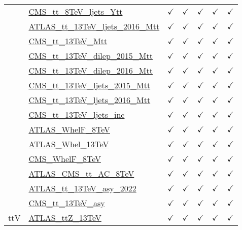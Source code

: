 \documentclass{article}
\begin{document}
\begin{longtable}{|c|l|c|c|c|c|c|}
 & \href{https://arxiv.org}{CMS_tt_8TeV_ljets_Ytt}  & $\checkmark$ & $\checkmark$ & $\checkmark$ & $\checkmark$ & $\checkmark$\\ \cline{2-7}
 & \href{https://arxiv.org}{ATLAS_tt_13TeV_ljets_2016_Mtt}  & $\checkmark$ & $\checkmark$ & $\checkmark$ & $\checkmark$ & $\checkmark$\\ \cline{2-7}
 & \href{https://arxiv.org}{CMS_tt_13TeV_Mtt}  & $\checkmark$ & $\checkmark$ & $\checkmark$ & $\checkmark$ & $\checkmark$\\ \cline{2-7}
 & \href{https://arxiv.org}{CMS_tt_13TeV_dilep_2015_Mtt}  & $\checkmark$ & $\checkmark$ & $\checkmark$ & $\checkmark$ & $\checkmark$\\ \cline{2-7}
 & \href{https://arxiv.org}{CMS_tt_13TeV_dilep_2016_Mtt}  & $\checkmark$ & $\checkmark$ & $\checkmark$ & $\checkmark$ & $\checkmark$\\ \cline{2-7}
 & \href{https://arxiv.org}{CMS_tt_13TeV_ljets_2015_Mtt}  & $\checkmark$ & $\checkmark$ & $\checkmark$ & $\checkmark$ & $\checkmark$\\ \cline{2-7}
 & \href{https://arxiv.org}{CMS_tt_13TeV_ljets_2016_Mtt}  & $\checkmark$ & $\checkmark$ & $\checkmark$ & $\checkmark$ & $\checkmark$\\ \cline{2-7}
 & \href{https://arxiv.org}{CMS_tt_13TeV_ljets_inc}  & $\checkmark$ & $\checkmark$ & $\checkmark$ & $\checkmark$ & $\checkmark$\\ \cline{2-7}
 & \href{https://arxiv.org}{ATLAS_WhelF_8TeV}  & $\checkmark$ & $\checkmark$ & $\checkmark$ & $\checkmark$ & $\checkmark$\\ \cline{2-7}
 & \href{https://arxiv.org}{ATLAS_Whel_13TeV}  & $\checkmark$ & $\checkmark$ & $\checkmark$ & $\checkmark$ & $\checkmark$\\ \cline{2-7}
 & \href{https://arxiv.org}{CMS_WhelF_8TeV}  & $\checkmark$ & $\checkmark$ & $\checkmark$ & $\checkmark$ & $\checkmark$\\ \cline{2-7}
 & \href{https://arxiv.org}{ATLAS_CMS_tt_AC_8TeV}  & $\checkmark$ & $\checkmark$ & $\checkmark$ & $\checkmark$ & $\checkmark$\\ \cline{2-7}
 & \href{https://arxiv.org}{ATLAS_tt_13TeV_asy_2022}  & $\checkmark$ & $\checkmark$ & $\checkmark$ & $\checkmark$ & $\checkmark$\\ \cline{2-7}
 & \href{https://arxiv.org}{CMS_tt_13TeV_asy}  & $\checkmark$ & $\checkmark$ & $\checkmark$ & $\checkmark$ & $\checkmark$
\\ \hline
\multirow{12}{*}{ttV}
 & \href{https://arxiv.org}{ATLAS_ttZ_13TeV}  & $\checkmark$ & $\checkmark$ & $\checkmark$ & $\checkmark$ & $\checkmark$\\ \cline{2-7}

\end{longtable}
\end{document}

